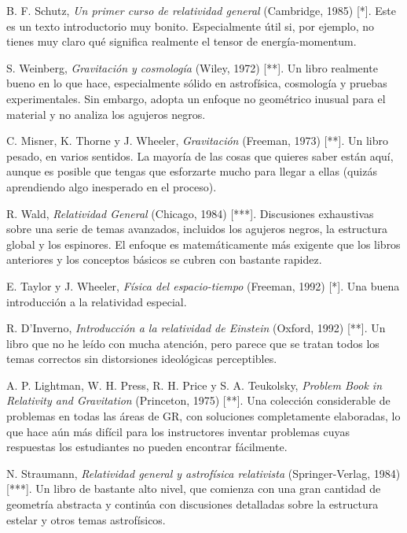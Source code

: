 \documentclass[11pt,b5paper,openany,twoside]{book}
\begin{document}
\begin{thebibliography}{99}

 B. F. Schutz, \textit{Un primer curso de relatividad general} (Cambridge, 1985) [*]. Este es un texto introductorio muy bonito. Especialmente útil si, por ejemplo, no tienes muy claro qué significa realmente el tensor de energía-momentum.

 S. Weinberg, \textit{Gravitación y cosmología} (Wiley, 1972) [**]. Un libro realmente bueno en lo que hace, especialmente sólido en astrofísica, cosmología y pruebas experimentales. Sin embargo, adopta un enfoque no geométrico inusual para el material y no analiza los agujeros negros.

 C. Misner, K. Thorne y J. Wheeler, \textit{Gravitación} (Freeman, 1973) [**]. Un libro pesado, en varios sentidos. La mayoría de las cosas que quieres saber están aquí, aunque es posible que tengas que esforzarte mucho para llegar a ellas (quizás aprendiendo algo inesperado en el proceso).

 R. Wald, \textit{Relatividad General} (Chicago, 1984) [***]. Discusiones exhaustivas sobre una serie de temas avanzados, incluidos los agujeros negros, la estructura global y los espinores. El enfoque es matemáticamente más exigente que los libros anteriores y los conceptos básicos se cubren con bastante rapidez.

 E. Taylor y J. Wheeler, \textit{Física del espacio-tiempo} (Freeman, 1992) [*]. Una buena introducción a la relatividad especial.

 R. D'Inverno, \textit{Introducción a la relatividad de Einstein} (Oxford, 1992) [**]. Un libro que no he leído con mucha atención, pero parece que se tratan todos los temas correctos sin distorsiones ideológicas perceptibles.

 A. P. Lightman, W. H. Press, R. H. Price y S. A. Teukolsky, \textit{Problem Book in Relativity and Gravitation} (Princeton, 1975) [**]. Una colección considerable de problemas en todas las áreas de GR, con soluciones completamente elaboradas, lo que hace aún más difícil para los instructores inventar problemas cuyas respuestas los estudiantes no pueden encontrar fácilmente.

 N. Straumann, \textit{Relatividad general y astrofísica relativista} (Springer-Verlag, 1984) [***]. Un libro de bastante alto nivel, que comienza con una gran cantidad de geometría abstracta y continúa con discusiones detalladas sobre la estructura estelar y otros temas astrofísicos.


\end{thebibliography}
\end{document}
